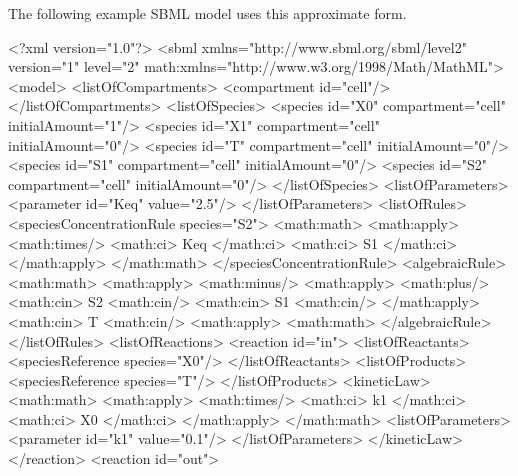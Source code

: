 \documentclass[10pt,twocolumntoc]{cekarticle}
\begin{document}
The following example SBML model uses this approximate form.

\begin{example}
<?xml version="1.0"?>
<sbml xmlns="http://www.sbml.org/sbml/level2" version="1" level="2"
      math:xmlns="http://www.w3.org/1998/Math/MathML">
    <model>
        <listOfCompartments>
            <compartment id="cell"/>
        </listOfCompartments>
        <listOfSpecies>
            <species id="X0" compartment="cell" initialAmount="1"/>
            <species id="X1" compartment="cell" initialAmount="0"/>
            <species id="T" compartment="cell" initialAmount="0"/>
            <species id="S1" compartment="cell" initialAmount="0"/>
            <species id="S2" compartment="cell" initialAmount="0"/>
        </listOfSpecies>
        <listOfParameters>
            <parameter id="Keq" value="2.5"/>
        </listOfParameters>
        <listOfRules>
            <speciesConcentrationRule species="S2">
                <math:math>
                    <math:apply>
                        <math:times/>
                        <math:ci> Keq </math:ci>
                        <math:ci> S1 </math:ci>
                    </math:apply>
                </math:math>
            </speciesConcentrationRule>
            <algebraicRule>
                <math:math>
                    <math:apply>
                        <math:minus/>
                        <math:apply>
                            <math:plus/>
                            <math:cin> S2 <math:cin/>
                            <math:cin> S1 <math:cin/>
                        </math:apply>
                        <math:cin> T <math:cin/>
                    <math:apply>
                <math:math>
            </algebraicRule>
        </listOfRules>
        <listOfReactions>
            <reaction id="in">
                <listOfReactants>
                    <speciesReference species="X0"/>
                </listOfReactants>
                <listOfProducts>
                    <speciesReference species="T"/>
                </listOfProducts>
                <kineticLaw>
                    <math:math>
                        <math:apply>
                            <math:times/>
                            <math:ci> k1 </math:ci>
                            <math:ci> X0 </math:ci>
                        </math:apply>
                    </math:math>
                    <listOfParameters>
                        <parameter id="k1" value="0.1"/>
                    </listOfParameters>
                </kineticLaw>
            </reaction>
            <reaction id="out">

\end{example}
\end{document}
